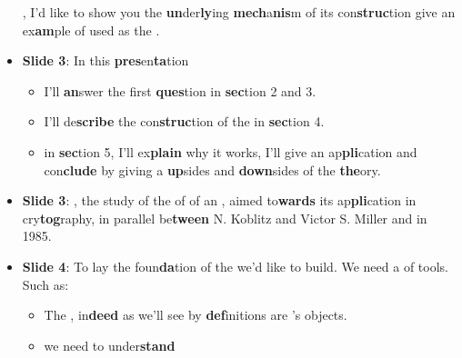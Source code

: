 \begin{itemize}
            , I'd like to show you the \textbf{un}der\textbf{ly}ing
            \textbf{mech}a\textbf{nis}m of its con\textbf{struc}tion  give an ex\textbf{am}ple of  used
               as the . 
        \item \textbf{Slide 3}:
            In this \textbf{pres}en\textbf{ta}tion
            \begin{itemize}
                \item I'll \textbf{an}swer the first \textbf{ques}tion in
                    \textbf{sec}tion 2 and 3.
                \item {} I'll de\textbf{scribe} the con\textbf{struc}tion of the  in \textbf{sec}tion 4.
                \item {} in \textbf{sec}tion 5, I'll ex\textbf{plain} why it
                    works,  I'll give an
                    ap\textbf{pli}cation and con\textbf{clude} by giving a  \textbf{up}sides and \textbf{down}sides of the
                    \textbf{the}ory.
            \end{itemize}
        \item \textbf{Slide 3}: , the study of the   of
             of an
            , aimed to\textbf{wards} its ap\textbf{pli}cation in cry\textbf{tog}raphy,  in
            parallel be\textbf{tween} N. Koblitz and Victor S. Miller and  in 1985.
        \item \textbf{Slide 4}: To lay the foun\textbf{da}tion of the  we'd like to
            build. We need a  of tools.
            Such as:
            \begin{itemize}
                \item The ,
                    in\textbf{deed} as we'll see by \textbf{def}initions  are
                    's objects.
                \item {} we need to under\textbf{stand} 

\end{itemize}
\end{itemize}

